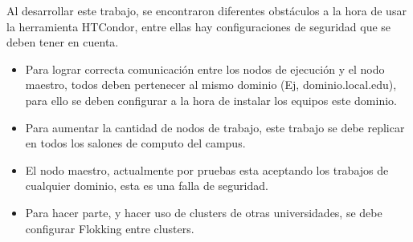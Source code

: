 Al desarrollar este trabajo, se encontraron diferentes obstáculos a la hora de usar la herramienta HTCondor, entre ellas hay configuraciones de seguridad que se deben tener en cuenta.
\begin{itemize}
	\item Para lograr correcta comunicación entre los nodos de ejecución y el nodo maestro, todos deben pertenecer al mismo dominio (Ej, dominio.local.edu), para ello se deben configurar a la hora de instalar los equipos este dominio.
    \item Para aumentar la cantidad de nodos de trabajo, este trabajo se debe replicar en todos los salones de computo del campus.
    \item El nodo maestro, actualmente por pruebas esta aceptando los trabajos de cualquier dominio, esta es una falla de seguridad.
    \item Para hacer parte, y hacer uso de clusters de otras universidades, se debe configurar Flokking entre clusters.
\end{itemize}






